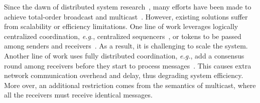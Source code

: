 
Since the dawn of distributed system research~\cite{lamport1978time}, many efforts have been made to achieve total-order broadcast and multicast~\cite{defago2004total}.
However, existing solutions suffer from scalability or efficiency limitations.
One line of work leverages logically centralized coordination, \textit{e.g.}, centralized sequencers~\cite{eris}, or tokens to be passed among senders and receivers~\cite{rajagopalan1989token,kim1997total,ekwall2004token}.
As a result, it is challenging to scale the system.
Another line of work uses fully distributed coordination, \textit{e.g.}, add a consensus round among receivers before they start to process messages~\cite{lamport1978time,chandra1996unreliable}.
This causes extra network communication overhead and delay, thus degrading system efficiency.
More over, an additional restriction comes from the semantics of multicast, where all the receivers must receive identical messages.


